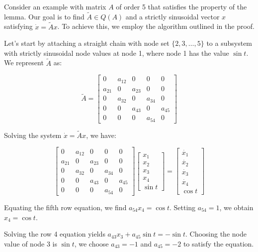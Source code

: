 \begin{example}
Consider an example with matrix $A$ of order 5 that satisfies the property of the lemma. Our goal is to find $\tilde{A} \in Q(A)$ and a strictly sinusoidal vector $x$ satisfying $\dot{x}=\tilde{A}x$. To achieve this, we employ the algorithm outlined in the proof.

Let's start by attaching a straight chain with node set $\{2,3,\ldots, 5\}$ to a subsystem with strictly sinusoidal node values at node 1, where node 1 has the value $\sin t$. We represent $\tilde{A}$ as:

\[
\tilde{A} = 
\begin{bmatrix}
	0 & a_{12} & 0 & 0 & 0 \\
	a_{21} & 0 & a_{23} & 0 & 0 \\
	0 & a_{32} & 0 & a_{34} & 0 \\
	0 & 0 & a_{43} & 0 & a_{45} \\
	0 & 0 & 0 & a_{54} & 0
\end{bmatrix}
\]

Solving the system $\dot{x} = \tilde{A}x$, we have:

\[
\begin{bmatrix}
	0 & a_{12} & 0 & 0 & 0 \\
	a_{21} & 0 & a_{23} & 0 & 0 \\
	0 & a_{32} & 0 & a_{34} & 0 \\
	0 & 0 & a_{43} & 0 & a_{45} \\
	0 & 0 & 0 & a_{54} & 0
\end{bmatrix}
\begin{bmatrix}
	x_1 \\
	x_2 \\
	x_3 \\
	x_4 \\
	\sin t
\end{bmatrix}
=
\begin{bmatrix}
	\dot{x_1} \\
	\dot{x_2} \\
	\dot{x_3} \\
	\dot{x_4} \\
	\cos t
\end{bmatrix}
\]

Equating the fifth row equation, we find $a_{54}x_4=\cos t$. Setting $a_{54}=1$, we obtain $x_4=\cos t$. 

Solving the row 4 equation yields $a_{43}x_3 + a_{45} \sin t = -\sin t$. Choosing the node value of node 3 is $\sin t$, we choose $a_{43} = -1$ and $a_{45} = -2$ to satisfy the equation.



\end{example}
